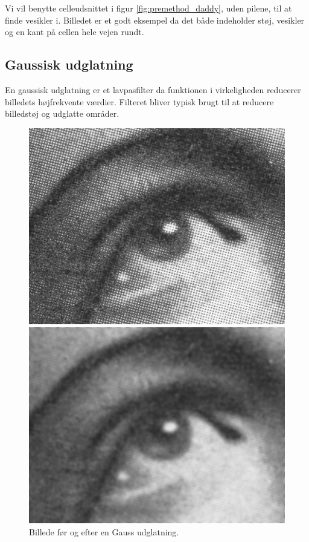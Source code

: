 Vi vil benytte celleudsnittet i figur \ref{fig:premethod_daddy}, uden pilene, til at finde vesikler i. Billedet er et godt eksempel da det både indeholder støj, vesikler og en kant på cellen hele vejen rundt.

\subsection{Gaussisk udglatning}\label{sec:premethod_gaussblur}
En gaussisk udglatning er et lavpasfilter da funktionen i virkeligheden reducerer billedets højfrekvente værdier. Filteret bliver typisk brugt til at reducere billedstøj og udglatte områder. 

\begin{figure}[H]
	\begin{minipage}[b]{0.5\linewidth}
		\centering
		\includegraphics[scale=1.5]{files/premethod/img/gauss_pre.png}
	\end{minipage}
	\hspace{0.5cm}
	\begin{minipage}[b]{0.5\linewidth}
		\centering
		\includegraphics[scale=1.5]{files/premethod/img/gauss_post.png}
	\end{minipage}
	\caption{Billede før og efter en Gauss udglatning\cite{gaussblur}.\label{fig:premethod_gauss}}
\end{figure}

